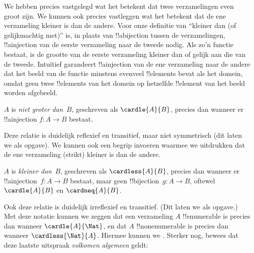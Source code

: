 \documentclass[../../../include/open-logic-section]{subfiles}
\begin{document}


\begin{explain}
We hebben precies vastgelegd wat het betekent dat twee verzamelingen
even groot zijn. We kunnen ook precies vastleggen wat het betekent dat de
ene verzameling kleiner is dan de andere. Voor onze definitie van ``kleiner
dan (of gelijkmachtig met)'' is, in plaats van !!a{bijection} tussen de
verzamelingen, !!a{injection} van de eerste verzameling naar de tweede nodig.
Als zo'n functie bestaat, is de grootte van de eerste verzameling kleiner
dan of gelijk aan die van de tweede. Intuïtief garandeert !!a{injection} van
de ene verzameling naar de andere dat het beeld van de functie minstens
evenveel !!{element}s bevat als het domein, omdat geen twee !!{element}s van
het domein op hetzelfde !!{element} van het beeld worden afgebeeld.
\end{explain}

\begin{defn}
$A$ is \emph{niet groter dan}~$B$, geschreven als $\cardle{A}{B}$, precies
dan wanneer er !!a{injection} $f \colon A \to B$ bestaat.
\end{defn}

Deze relatie is duidelijk reflexief en transitief, maar niet symmetrisch
(dit laten we als opgave). We kunnen ook een begrip invoeren waarmee we
uitdrukken dat de ene verzameling (strikt) kleiner is dan de andere. 

\begin{defn}
$A$ is \emph{kleiner dan}~$B$, geschreven als $\cardless{A}{B}$, precies dan
wanneer er !!a{injection}~$f\colon A \to B$ bestaat, maar geen
!!{bijection}~$g\colon A \to B$, oftewel $\cardle{A}{B}$ en
$\cardneq{A}{B}$.
\end{defn}

Ook deze relatie is duidelijk irreflexief en transitief. (Dit laten we als
opgave.) Met deze notatie kunnen we zeggen dat een verzameling $A$
!!{enumerable} is precies dan wanneer $\cardle{A}{\Nat}$, en dat $A$
!!{nonenumerable} is precies dan wanneer $\cardless{\Nat}{A}$. Hiermee
kunnen we
. Sterker nog, \citet{Cantor1892}
bewees dat deze laatste uitspraak \emph{volkomen algemeen} geldt:
\end{document}
